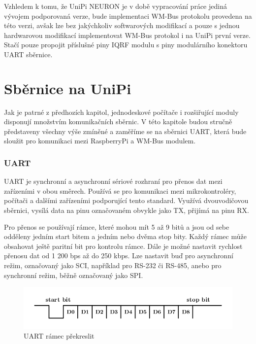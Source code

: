 Vzhledem k tomu, že UniPi NEURON je v době vypracování práce jediná vývojem podporovaná verze, bude implementaci WM-Bus protokolu provedena na této verzi, avšak lze bez jakýchkoliv softwarových modifikací a pouze s jednou hardwarovou modifikací implementovat WM-Bus protokol i na UniPi první verze. Stačí pouze propojit příslušné piny IQRF modulu s piny modulárního konektoru UART sběrnice.



\section{Sběrnice na UniPi}
Jak je patrné z předhozích kapitol, jednodeskové počítače i rozšiřující moduly disponují množstvím komunikačních sběrnic. V této kapitole budou stručně představeny všechny výše zmíněné a zaměříme se na sběrnici UART, která bude sloužit pro komunikaci mezi RaspberryPi a WM-Bus modulem.

\subsubsection{UART}
UART je synchronní a asynchronní sériové rozhraní pro přenos dat mezi zařízeními v obou směrech. Používá se pro komunikaci mezi mikrokontroléry, počítači a dalšími zařízeními podporující tento standard. Využívá dvouvodičovou sběrnici, vysílá data na pinu označovaném obvykle jako TX, přijímá na pinu RX.

Pro přenos se používají rámce, které mohou mít 5 až 9 bitů a jsou od sebe odděleny jedním start bitem a jedním nebo dvěma stop bity. Každý rámec může obsahovat ještě paritní bit pro kontrolu rámce. Dále je možné nastavit rychlost přenosu dat od 1 200 bps až do 250 kbps. Lze nastavit buď pro asynchronní režim, označovaný jako SCI, například pro RS-232 či RS-485, anebo pro synchronní režim, běžně označovaný jako SPI.

 \begin{figure}[!h]
  \begin{center}
    \includegraphics[scale=1.0]{obrazky/sbernice_uart}
  \end{center}
  \caption{UART rámec \cite{sberniceUART} \colorbox[rgb]{0,1,0}{překreslit}}
\end{figure}

